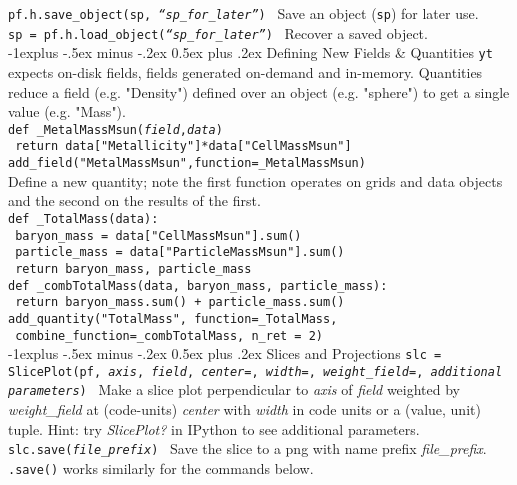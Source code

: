\documentclass[10pt,landscape]{article}
\makeatletter
\renewcommand{\subsection}{\@startsection{subsection}{2}{0mm}%
                                {-1explus -.5ex minus -.2ex}%
                                {0.5ex plus .2ex}%
                                {\normalfont\normalsize\bfseries}}
\makeatother
\begin{document}
\begin{multicols}{3}
\texttt{pf.h.save\_object(sp, {\it ``sp\_for\_later''})} \textemdash\ Save an object (\texttt{sp}) for later use.\\
\texttt{sp = pf.h.load\_object({\it ``sp\_for\_later''})} \textemdash\ Recover a saved object.\\


\subsection{Defining New Fields \& Quantities}
\texttt{yt} expects on-disk fields, fields generated on-demand and in-memory. Quantities reduce a field (e.g. "Density") defined over an object (e.g. "sphere") to get a single value (e.g. "Mass"). \\
\texttt{def \_MetalMassMsun({\it field},{\it data})}\\
\texttt{\hspace{4 mm} return data["Metallicity"]*data["CellMassMsun"]}\\
\texttt{add\_field("MetalMassMsun",function=\_MetalMassMsun)}\\
Define a new quantity; note the first function operates on grids and data objects and the second on the results of the first. \\
\texttt{def \_TotalMass(data): }\\
\texttt{\hspace{4 mm} baryon\_mass = data["CellMassMsun"].sum()}\\
\texttt{\hspace{4 mm} particle\_mass = data["ParticleMassMsun"].sum()}\\
\texttt{\hspace{4 mm} return baryon\_mass, particle\_mass}\\
\texttt{def \_combTotalMass(data, baryon\_mass, particle\_mass):}\\
\texttt{\hspace{4 mm} return baryon\_mass.sum() + particle\_mass.sum()}\\
\texttt{add\_quantity("TotalMass", function=\_TotalMass,}\\
\texttt{\hspace{4 mm} combine\_function=\_combTotalMass, n\_ret = 2)}\\



\subsection{Slices and Projections}
\texttt{slc = SlicePlot(pf, {\it axis}, {\it field}, {\it center=}, {\it width=}, {\it weight\_field=}, {\it additional parameters})} \textemdash\ Make a slice plot
perpendicular to {\it axis} of {\it field} weighted by {\it weight\_field} at (code-units) {\it center} with 
{\it width} in code units or a (value, unit) tuple. Hint: try {\it SlicePlot?} in IPython to see additional parameters.\\
\texttt{slc.save({\it file\_prefix})} \textemdash\ Save the slice to a png with name prefix {\it file\_prefix}.
\texttt{.save()} works similarly for the commands below.\\


\end{multicols}
\end{document}
